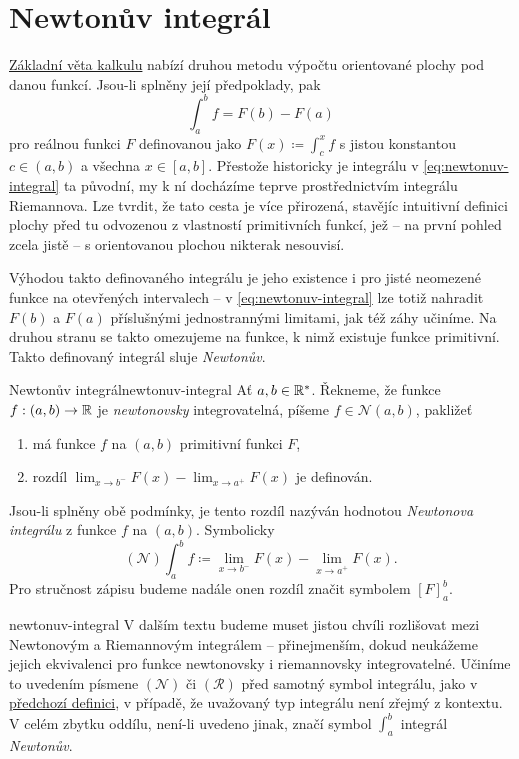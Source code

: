 \section{Newtonův integrál}
\label{sec:newtonuv-integral}

\hyperref[thm:zakladni-veta-kalkulu]{Základní věta kalkulu} nabízí druhou metodu
výpočtu orientované plochy pod danou funkcí. Jsou-li splněny její předpoklady,
pak
\begin{equation}
 \label{eq:newtonuv-integral}
 \int_{a}^{b} f = F(b) - F(a)
\end{equation}
pro reálnou funkci $F$ definovanou jako $F(x) \coloneqq \int_{c}^{x} f$ s jistou
konstantou $c \in (a,b)$ a všechna $x \in [a,b]$. Přestože historicky je
 integrálu v \eqref{eq:newtonuv-integral} ta původní, my k ní
docházíme teprve prostřednictvím integrálu Riemannova. Lze tvrdit, že tato cesta
je více přirozená, stavějíc intuitivní definici plochy před tu odvozenou z
vlastností primitivních funkcí, jež -- na první pohled zcela jistě -- s
orientovanou plochou nikterak nesouvisí.

Výhodou takto definovaného integrálu je jeho existence i pro jisté neomezené
funkce na otevřených intervalech -- v \eqref{eq:newtonuv-integral} lze totiž
nahradit $F(b)$ a $F(a)$ příslušnými jednostrannými limitami, jak též záhy
učiníme. Na druhou stranu se takto omezujeme na funkce, k nimž existuje funkce
primitivní. Takto definovaný integrál sluje \emph{Newtonův}.

\begin{definition}{Newtonův integrál}{newtonuv-integral}
 Ať $a,b \in \mathbb{R}^{*}$. Řekneme, že funkce $f:(a,b) \to \mathbb{R}$ je \emph{newtonovsky}
 integrovatelná, píšeme $f \in \mathcal{N}(a,b)$, pakližeť
 \begin{enumerate}
  \item má funkce $f$ na $(a,b)$ primitivní funkci $F$,
  \item rozdíl $\lim_{x \to b^{-}} F(x) - \lim_{x \to a^{+}} F(x)$ je definován.
 \end{enumerate}
 Jsou-li splněny obě podmínky, je tento rozdíl nazýván hodnotou \emph{Newtonova
 integrálu} z funkce $f$ na $(a,b)$. Symbolicky
 \[
  (\mathcal{N}) \int_{a}^{b} f \coloneqq \lim_{x \to b^{-}} F(x) - \lim_{x \to
  a^{+}} F(x).
 \]
 Pro stručnost zápisu budeme nadále onen rozdíl značit symbolem $[F]_a^{b}$.
\end{definition}

\begin{remark}{}{newtonuv-integral}
 V dalším textu budeme muset jistou chvíli rozlišovat mezi Newtonovým a
 Riemannovým integrálem -- přinejmenším, dokud neukážeme jejich ekvivalenci pro
 funkce newtonovsky i riemannovsky integrovatelné. Učiníme to uvedením písmene
 $(\mathcal{N})$ či $(\mathcal{R})$ před samotný symbol integrálu, jako v
 \hyperref[def:newtonuv-integral]{předchozí definici}, v případě, že uvažovaný
 typ integrálu není zřejmý z kontextu. V celém zbytku oddílu, není-li uvedeno
 jinak, značí symbol $\int_{a}^{b}$ integrál \emph{Newtonův}.
\end{remark}

